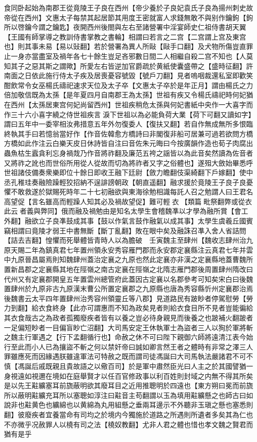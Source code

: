 食同卧起始為南郡王從竟陵王子良在西州【帝少養於子良妃袁氏子良為揚州刺史故帝從在西州】文惠太子每禁其起居節其用度王密就富人求錢無敢不與别作鑰鉤【鉤所以啓鑰今謂之鑰匙】夜開西州後閤與左右至諸營署中淫宴師史仁祖侍書胡天翼【王國有師掌導之教訓侍書掌教之書輪】相謂曰若言之二宫【二宫謂上宫及東宫也】則其事未易【易以䜴翻】若於營署為異人所敺【敺手口翻】及犬物所傷豈直罪止一身亦當盡室及禍年各七十餘生豈足吝邪數日間二人相繼自殺二宫不知也【人莫知其子之惡其斯之謂歟】所愛左右皆逆加官爵疏於黄紙使囊盛帶之【盛時征翻】許南面之日依此施行侍太子疾及居喪憂容號毀【號戶刀翻】見者嗚咽裁還私室即歡笑酣飲常令女巫楊氏禱祀速求天位及太子卒【文惠太子卒於是年正月】謂由楊氏之力倍加敬信既為太孫【是年夏四月自南郡王為太孫】世祖有疾又令楊氏禱祀時何妃猶在西州【太孫居東宫何妃尚留西州】世祖疾稍危太孫與何妃書紙中央作一大喜字而作三十六小喜字繞之侍世祖疾言淚下世祖以為必能負荷大業【荷下可翻又讀如字】謂曰五年中一委宰相汝弗措意五年外勿復委人【復扶又翻】若自作無成無所多恨臨終執其手曰若憶翁當好作【作音佐韓愈方橋詩曰非閣復非船可居兼可過若欲問方橋方橋如此作注云白樂天皮日休詩皆自注曰音佐朱元晦曰今按廣韻作造也荀子肉腐出蟲魚枯生蠧貪利忘身禍烖乃作音將祚翻及廉范五袴之謡皆以為此音矣然讀為佐音者又將祚之訛也而世俗所用從人從故而切為將祚者又字之俗體也】遂殂大斂始畢悉呼世祖諸伎備奏衆樂即位十餘日即收王融下廷尉【斂力瞻翻伎渠綺翻下戶嫁翻】使中丞孔稚珪奏融險躁輕狡招納不逞誹謗朝政【朝直遥翻】融求援於竟陵王子良子良憂懼不敢救遂於獄賜死時年二十七初融欲與東海徐勉相識每託人召之勉謂人曰王君名高望促【言名雖高而輕躁人知其必及禍故望促】難可輕衣【類篇毗祭翻弊或從衣此云者義與弊同】俄而融及禍勉由是知名太學生會稽魏凖以才學為融所賞【會工外翻】融欲立子良凖鼓成其事【鼓以作氣言鼓作融氣以成其事】太學生虞羲丘國賓竊相謂曰竟陵才弱王中書無斷【斷丁亂翻】敗在眼中矣及融誅召凖入舍人省詰問【詰去吉翻】惶懼而死舉體皆青時人以為膽破　壬寅魏主至肆州【魏收志肆州治九原天賜二年為鎮真君七年置州領永安秀容雁門郡而永安郡定襄縣注云真君七年并雲中九原晉昌屬焉則知魏肆州蓋治定襄之九原也然此定襄亦非漢之定襄縣地蓋曹魏所置新昌郡之定襄縣其地在陘嶺之南古定襄在陘嶺之北隋志雁門郡後周置肆州隋改曰代州又有定襄郡開皇五年置雲州總管府此蓋因古定襄以名郡參考可知矣宋白曰後魏置肆州於九原非古九原漢末曹公所置定襄郡之九原縣也唐為秀容縣忻州定襄郡治焉後魏書云太平四年置肆州治秀容州領靈丘等八郡】見道路民有跛眇者停駕慰勞【勞力到翻】給衣食終身【此亦可謂惠而不知為政矣見者則給衣食目所不見者豈能徧給其衣食哉古之為政者孤獨廢疾者皆有以養之豈必待身親見而後養之也跛補火翻跛者一足偏短眇者一目偏盲眇亡沼翻】大司馬安定王休執軍士為盜者三人以狥於軍將斬之魏主行軍遇之【行下孟翻循行也】命赦之休不可曰陛下親御六師將遠清江表今始行至此而小人已為攘盜不斬之何以禁奸帝曰誠如卿言然王者之體時有非常之澤三人罪雖應死而因緣遇朕雖違軍法可特赦之既而謂司徒馮誕曰大司馬執法嚴諸君不可不慎【馮誕后戚既親且貴故語之以儆百司】於是軍中肅然臣光曰人主之於其國譬猶一身視遠如視邇在境如在庭舉賢才以任百官修政事以利百姓則封域之内無不得其所矣是以先王黈纊塞耳前旒蔽明欲其廢耳目之近用推聰明於四遠也【東方朔曰冕而前旒所以蔽明黈纊充耳所以塞聰如淳注曰黈音主苟翻謂以玉為填用黈纊懸之也師古曰如說非也黈黄色也纊綿也以黄綿為丸用組懸之垂兩耳邊示不外聽非玉瑱之懸也塞悉則翻】彼廢疾者宜養當命有司均之於境内今獨施於道路之所遇則所遺者多矣其為仁也不亦微乎况赦罪人以橈有司之法【橈奴教翻】尤非人君之體也惜也孝文魏之賢君而猶有是乎

